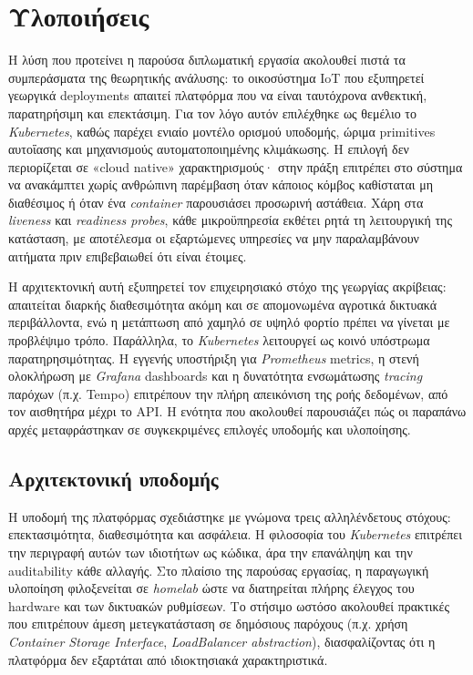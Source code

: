 \chapter{Υλοποιήσεις}

Η λύση που προτείνει η παρούσα διπλωματική εργασία ακολουθεί πιστά τα
συμπεράσματα της θεωρητικής ανάλυσης: το οικοσύστημα IoT που εξυπηρετεί
γεωργικά deployments απαιτεί πλατφόρμα που να είναι ταυτόχρονα ανθεκτική,
παρατηρήσιμη και επεκτάσιμη. Για τον λόγο αυτόν επιλέχθηκε ως θεμέλιο το
\textit{Kubernetes}, καθώς παρέχει ενιαίο μοντέλο ορισμού υποδομής, ώριμα
primitives αυτοΐασης και μηχανισμούς αυτοματοποιημένης κλιμάκωσης. Η επιλογή
δεν περιορίζεται σε «cloud native» χαρακτηρισμούς· στην πράξη επιτρέπει στο
σύστημα να ανακάμπτει χωρίς ανθρώπινη παρέμβαση όταν κάποιος κόμβος καθίσταται
μη διαθέσιμος ή όταν ένα \textit{container} παρουσιάσει προσωρινή αστάθεια.
Χάρη στα \textit{liveness} και \textit{readiness probes}, κάθε μικροϋπηρεσία
εκθέτει ρητά τη λειτουργική της κατάσταση, με αποτέλεσμα οι εξαρτώμενες
υπηρεσίες να μην παραλαμβάνουν αιτήματα πριν επιβεβαιωθεί ότι είναι έτοιμες.

Η αρχιτεκτονική αυτή εξυπηρετεί τον επιχειρησιακό στόχο της γεωργίας ακρίβειας:
απαιτείται διαρκής διαθεσιμότητα ακόμη και σε απομονωμένα αγροτικά δικτυακά
περιβάλλοντα, ενώ η μετάπτωση από χαμηλό σε υψηλό φορτίο πρέπει να γίνεται με
προβλέψιμο τρόπο. Παράλληλα, το \textit{Kubernetes} λειτουργεί ως κοινό
υπόστρωμα παρατηρησιμότητας. Η εγγενής υποστήριξη για \textit{Prometheus}
metrics, η στενή ολοκλήρωση με \textit{Grafana} dashboards και η δυνατότητα
ενσωμάτωσης \textit{tracing} παρόχων (π.χ. Tempo) επιτρέπουν την πλήρη
απεικόνιση της ροής δεδομένων, από τον αισθητήρα μέχρι το API. Η ενότητα που
ακολουθεί παρουσιάζει πώς οι παραπάνω αρχές μεταφράστηκαν σε συγκεκριμένες
επιλογές υποδομής και υλοποίησης.

\section{Αρχιτεκτονική υποδομής}

Η υποδομή της πλατφόρμας σχεδιάστηκε με γνώμονα τρεις αλληλένδετους στόχους:
επεκτασιμότητα, διαθεσιμότητα και ασφάλεια. Η φιλοσοφία του \textit{Kubernetes}
επιτρέπει την περιγραφή αυτών των ιδιοτήτων ως κώδικα, άρα την επανάληψη και
την auditability κάθε αλλαγής. Στο πλαίσιο της παρούσας εργασίας, η παραγωγική
υλοποίηση φιλοξενείται σε \textit{homelab} ώστε να διατηρείται πλήρης έλεγχος
του hardware και των δικτυακών ρυθμίσεων. Το στήσιμο ωστόσο ακολουθεί πρακτικές
που επιτρέπουν άμεση μετεγκατάσταση σε δημόσιους παρόχους (π.χ. χρήση
\textit{Container Storage Interface}, \textit{LoadBalancer abstraction}),
διασφαλίζοντας ότι η πλατφόρμα δεν εξαρτάται από ιδιοκτησιακά χαρακτηριστικά.

